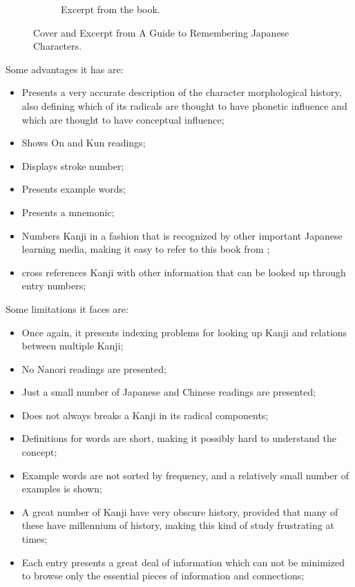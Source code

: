 \begin{figure}[ht]
\begin{subfigure}{0.5\textwidth}
    \caption{Excerpt from the book.}
    \label{fig:henshallbookpage}
    \end{subfigure}
    \caption{Cover and Excerpt from A Guide to Remembering Japanese Characters.}
    \label{fig:henshallbook}
\end{figure}

Some advantages it has are:
\begin{itemize}
    \item Presents a very accurate description of the character morphological history, also defining which of its radicals are thought to have phonetic influence and which are thought to have conceptual influence;
    \item Shows On and Kun readings;
    \item Displays stroke number;
    \item Presents example words;
    \item Presents a mnemonic;
    \item Numbers Kanji in a fashion that is recognized by other important Japanese learning media, making it easy to refer to this book from ;
    \item cross references Kanji with other information that can be looked up through entry numbers;
\end{itemize}

Some limitations it faces are:
\begin{itemize}
    \item Once again, it presents indexing problems for looking up Kanji and relations between multiple Kanji;
    \item No Nanori readings are presented;
    \item Just a small number of Japanese and Chinese readings are presented;
    \item Does not always breaks a Kanji in its radical components;
    \item Definitions for words are short, making it possibly hard to understand the concept;
    \item Example words are not sorted by frequency, and a relatively small number of examples is shown;
    \item A great number of Kanji have very obscure history, provided that many of these have millennium of history, making this kind of study frustrating at times;
    \item Each entry presents a great deal of information which can not be minimized to browse only the essential pieces of information and connections;
\end{itemize}

